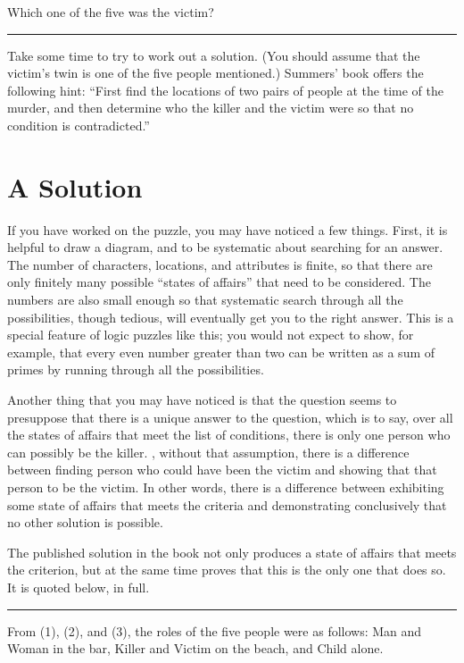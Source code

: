 \documentclass[letterpaper,10pt,english]{sphinxmanual}
\begin{document}
\sphinxAtStartPar
Which one of the five was the victim?


\bigskip\hrule\bigskip


\sphinxAtStartPar
Take some time to try to work out a solution. (You should assume that the victim’s twin is one of the five people mentioned.) Summers’ book offers the following hint: “First find the locations of two pairs of people at the time of the murder, and then determine who the killer and the victim were so that no condition is contradicted.”


\section{A Solution}
\label{\detokenize{propositional_logic:a-solution}}
\sphinxAtStartPar
If you have worked on the puzzle, you may have noticed a few things. First, it is helpful to draw a diagram, and to be systematic about searching for an answer. The number of characters, locations, and attributes is finite, so that there are only finitely many possible “states of affairs” that need to be considered. The numbers are also small enough so that systematic search through all the possibilities, though tedious, will eventually get you to the right answer. This is a special feature of logic puzzles like this; you would not expect to show, for example, that every even number greater than two can be written as a sum of primes by running through all the possibilities.

\sphinxAtStartPar
Another thing that you may have noticed is that the question seems to presuppose that there is a unique answer to the question, which is to say, over all the states of affairs that meet the list of conditions, there is only one person who can possibly be the killer. , without that assumption, there is a difference between finding  person who could have been the victim and showing that that person  to be the victim. In other words, there is a difference between exhibiting some state of affairs that meets the criteria and demonstrating conclusively that no other solution is possible.

\sphinxAtStartPar
The published solution in the book not only produces a state of affairs that meets the criterion, but at the same time proves that this is the only one that does so. It is quoted below, in full.


\bigskip\hrule\bigskip


\sphinxAtStartPar
From (1), (2), and (3), the roles of the five people were as follows: Man and Woman in the bar, Killer and Victim on the beach, and Child alone.
\end{document}
